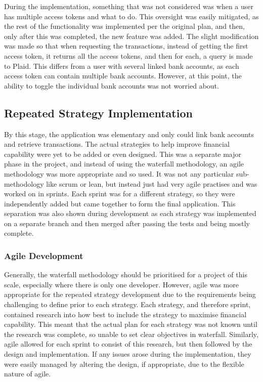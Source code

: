 During the implementation, something that was not considered was when a user has multiple access tokens and what to do. This oversight was easily mitigated, as the rest of the functionality was implemented per the original plan, and then, only after this was completed, the new feature was added. The slight modification was made so that when requesting the transactions, instead of getting the first access token, it returns all the access tokens, and then for each, a query is made to Plaid. This differs from a user with several linked bank accounts, as each access token can contain multiple bank accounts. However, at this point, the ability to toggle the individual bank accounts was not worried about.

\subsection{Repeated Strategy Implementation}
By this stage, the application was elementary and only could link bank accounts and retrieve transactions. The actual strategies to help improve financial capability were yet to be added or even designed. This was a separate major phase in the project, and instead of using the waterfall methodology, an agile methodology was more appropriate and so used. It was not any particular sub-methodology like scrum or lean, but instead just had very agile practises and was worked on in sprints. Each sprint was for a different strategy, so they were independently added but came together to form the final application. This separation was also shown during development as each strategy was implemented on a separate branch and then merged after passing the tests and being mostly complete.


\subsubsection{Agile Development}
Generally, the waterfall methodology should be prioritised for a project of this scale, especially where there is only one developer. However, agile was more appropriate for the repeated strategy development due to the requirements being challenging to define prior to each strategy. Each strategy, and therefore sprint, contained research into how best to include the strategy to maximise financial capability. This meant that the actual plan for each strategy was not known until the research was complete, so unable to set clear objectives in waterfall. Similarly, agile allowed for each sprint to consist of this research, but then followed by the design and implementation. If any issues arose during the implementation, they were easily managed by altering the design, if appropriate, due to the flexible nature of agile.


